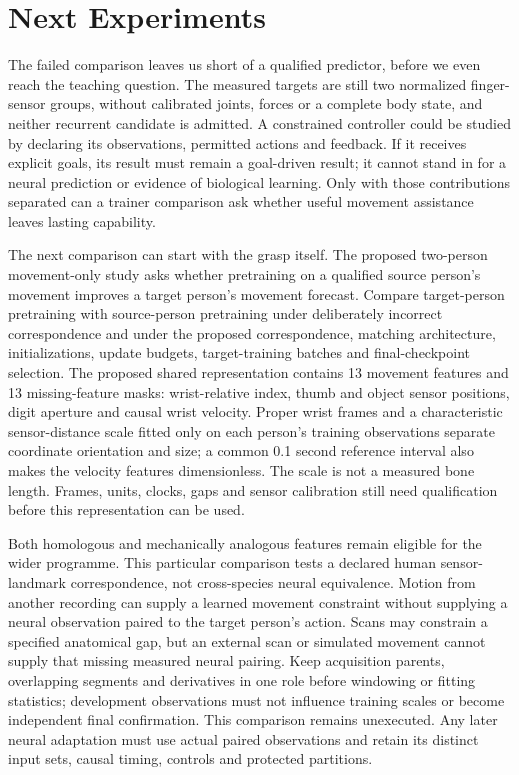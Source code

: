 \section{Next Experiments}

The failed comparison leaves us short of a qualified predictor, before we even reach the teaching question. The measured targets are still two normalized finger-sensor groups, without calibrated joints, forces or a complete body state, and neither recurrent candidate is admitted. A constrained controller could be studied by declaring its observations, permitted actions and feedback. If it receives explicit goals, its result must remain a goal-driven result; it cannot stand in for a neural prediction or evidence of biological learning. Only with those contributions separated can a trainer comparison ask whether useful movement assistance leaves lasting capability.\par

The next comparison can start with the grasp itself. The proposed two-person movement-only study asks whether pretraining on a qualified source person's movement improves a target person's movement forecast. Compare target-person pretraining with source-person pretraining under deliberately incorrect correspondence and under the proposed correspondence, matching architecture, initializations, update budgets, target-training batches and final-checkpoint selection. The proposed shared representation contains 13 movement features and 13 missing-feature masks: wrist-relative index, thumb and object sensor positions, digit aperture and causal wrist velocity. Proper wrist frames and a characteristic sensor-distance scale fitted only on each person's training observations separate coordinate orientation and size; a common 0.1 second reference interval also makes the velocity features dimensionless. The scale is not a measured bone length. Frames, units, clocks, gaps and sensor calibration still need qualification before this representation can be used.\par

Both homologous and mechanically analogous features remain eligible for the wider programme. This particular comparison tests a declared human sensor-landmark correspondence, not cross-species neural equivalence. Motion from another recording can supply a learned movement constraint without supplying a neural observation paired to the target person's action. Scans may constrain a specified anatomical gap, but an external scan or simulated movement cannot supply that missing measured neural pairing. Keep acquisition parents, overlapping segments and derivatives in one role before windowing or fitting statistics; development observations must not influence training scales or become independent final confirmation. This comparison remains unexecuted. Any later neural adaptation must use actual paired observations and retain its distinct input sets, causal timing, controls and protected partitions.\par


